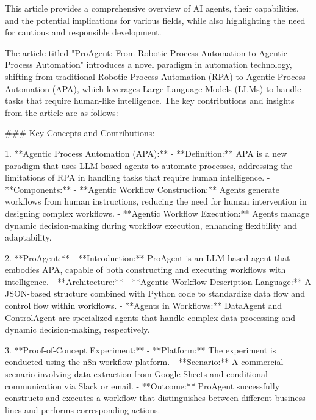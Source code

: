 This article provides a comprehensive overview of AI agents, their capabilities, and the potential implications for various fields, while also highlighting the need for cautious and responsible development.





The article titled "ProAgent: From Robotic Process Automation to Agentic Process Automation" introduces a novel paradigm in automation technology, shifting from traditional Robotic Process Automation (RPA) to Agentic Process Automation (APA), which leverages Large Language Models (LLMs) to handle tasks that require human-like intelligence. The key contributions and insights from the article are as follows:

### Key Concepts and Contributions:

1. **Agentic Process Automation (APA):**
   - **Definition:** APA is a new paradigm that uses LLM-based agents to automate processes, addressing the limitations of RPA in handling tasks that require human intelligence.
   - **Components:**
     - **Agentic Workflow Construction:** Agents generate workflows from human instructions, reducing the need for human intervention in designing complex workflows.
     - **Agentic Workflow Execution:** Agents manage dynamic decision-making during workflow execution, enhancing flexibility and adaptability.

2. **ProAgent:**
   - **Introduction:** ProAgent is an LLM-based agent that embodies APA, capable of both constructing and executing workflows with intelligence.
   - **Architecture:**
     - **Agentic Workflow Description Language:** A JSON-based structure combined with Python code to standardize data flow and control flow within workflows.
     - **Agents in Workflows:** DataAgent and ControlAgent are specialized agents that handle complex data processing and dynamic decision-making, respectively.

3. **Proof-of-Concept Experiment:**
   - **Platform:** The experiment is conducted using the n8n workflow platform.
   - **Scenario:** A commercial scenario involving data extraction from Google Sheets and conditional communication via Slack or email.
   - **Outcome:** ProAgent successfully constructs and executes a workflow that distinguishes between different business lines and performs corresponding actions.

